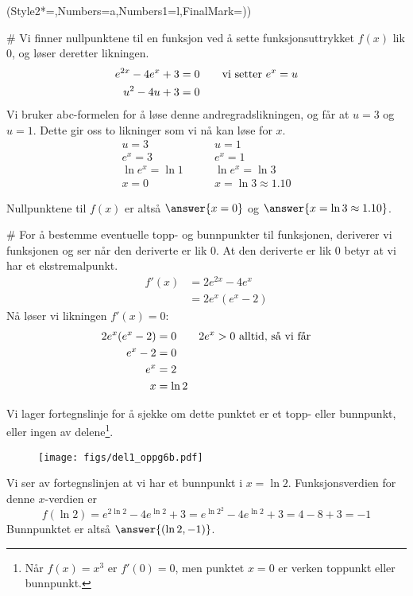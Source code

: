 \begin{easylist}[enumerate]
	\ListProperties(Style2*=,Numbers=a,Numbers1=l,FinalMark={)})
	
	# Vi finner nullpunktene til en funksjon ved å sette funksjonsuttrykket $f(x)$ lik $0$, og løser deretter likningen.
	\begin{align*}
		e^{2x} - 4e^{x} + 3 &= 0 \qquad \textnormal{vi setter $e^x = u$}\\ 
		u^2 - 4u + 3 &= 0
	\end{align*}
	Vi bruker abc-formelen for å løse denne andregradslikningen, og får at $u = 3$ og $u = 1$. Dette gir oss to likninger som vi nå kan løse for $x$.
	\begin{align*}
		u = 3 & \qquad u = 1 \\
		e^x = 3 & \qquad e^x = 1 \\
		\ln e^x = \ln 1 & \qquad \ln e^x = \ln 3\\
		x = 0 & \qquad x = \ln 3 \approx 1.10
	\end{align*}
	
	Nullpunktene til $f(x)$ er altså $	\answer{x = 0}$ og $\answer{x = \ln 3 \approx 1.10}$.
	
	# For å bestemme eventuelle topp- og bunnpunkter til funksjonen, deriverer vi funksjonen og ser når den deriverte er lik $0$. 
	At den deriverte er lik $0$ betyr at vi har et ekstremalpunkt.
	\begin{align*}
		f'(x) &= 2e^{2x} - 4e^x \\
		& = 2e^x(e^x - 2)
	\end{align*}
	Nå løser vi likningen $f'(x) = 0$:
	\begin{align*}
		2e^x(e^x - 2) & = 0 \qquad \textnormal{$2e^x > 0$ alltid, så vi får}\\
		e^x - 2 & = 0 \\
		e^x & = 2 \\
		x & = \ln 2
	\end{align*}
	
	Vi lager fortegnslinje for å sjekke om dette punktet er et topp- eller bunnpunkt, eller ingen av delene\footnote{Når $f(x) = x^3$ er $f'(0) = 0$, men punktet $x=0$ er verken toppunkt eller bunnpunkt.}.
	\begin{figure}[ht!]
		\centering
		\texttt{[image: figs/del1\_oppg6b.pdf]}
		\label{fig:del1_oppg6b}
	\end{figure}
	Vi ser av fortegnslinjen at vi har et bunnpunkt i $x = \ln 2$. Funksjonsverdien for denne $x$-verdien er
	\begin{equation*}
		f(\ln 2)  = e^{2\ln2} - 4e^{\ln 2} + 3 
		= e^{\ln 2^2} - 4e^{\ln 2} + 3  
		= 4 - 8 + 3 = -1
	\end{equation*}
	Bunnpunktet er altså $\answer{(\ln 2, -1)}$.
	

\end{easylist}
